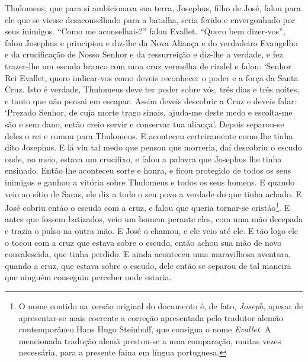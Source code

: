 Thulomeus, que para si ambicionava sua terra, Josephus, filho de José, falou
para ele que se viesse desaconselhado para a batalha, seria ferido e
envergonhado por seus inimigos. “Como me aconselhais?” falou Evallet. “Quero
bem dizer-vos”, falou Josephus e principiou e diz-lhe da Nova Aliança e do
verdadeiro Evangelho e da crucificação de Nosso Senhor e da ressurreição e
diz-lhe a verdade, e fez trazer-lhe um escudo branco com uma cruz vermelha de
cindel e falou: ‘Senhor Rei Evallet, quero indicar-vos como deveis reconhecer o
poder e a força da Santa Cruz. Isto é verdade, Thulomeus deve ter poder sobre
vós, três dias e três noites, e tanto que não pensai em escapar. Assim deveis
descobrir a Cruz e deveis falar: ‘Prezado Senhor, de cuja morte trago sinais,
ajuda-me deste medo e escolta-me são e sem dano, então creio servir e conservar
tua aliança’. Depois separou-se deles o rei e rumou para Thulomeus. E aconteceu
certeiramente como lhe tinha dito Josephus. E lá viu tal medo que pensou que
morreria, daí descobriu o escudo onde, no meio, estava um crucifixo, e falou a
palavra que Josephus lhe tinha ensinado. Então lhe aconteceu sorte e honra, e
ficou protegido de todos os seus inimigos e ganhou a vitória sobre Thulomeus e
todos os seus homens. E quando veio ao sítio de Saras, ele diz a todo o seu povo
a verdade do que tinha achado. E José cobriu então o escudo com a cruz, e falou
que queria tornar-se cristão\footnote{ O nome contido na versão original do
documento é, de fato, \textit{Joseph}, apesar de apresentar-se mais coerente a
correção apresentada pelo tradutor alemão contemporâneo Hans Hugo Steinhoff,
que consigna o nome \textit{Evallet}. A mencionada tradução alemã prestou-se a
uma comparação, muitas vezes necessária, para a presente faina em língua
portuguesa.}. E antes que fossem batizados, veio um homem perante
eles, com uma mão decepada e trazia o pulso na outra mão. E José o chamou, e
ele veio até ele. E tão logo ele o tocou com a cruz que estava sobre o escudo,
então achou sua mão de novo convalescida, que tinha perdido. E ainda aconteceu
uma maravilhosa aventura, quando a cruz, que estava sobre o escudo, dele então
se separou de tal maneira que ninguém conseguiu perceber onde estaria. 

